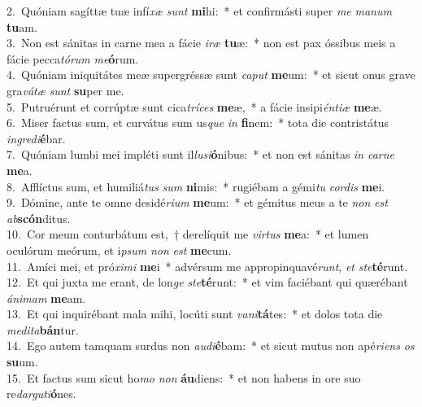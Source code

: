 {2.~}Quóniam sagíttæ tuæ infí\textit{xæ} \textit{sunt} \textbf{mi}hi:~* et confirmásti super \textit{me} \textit{ma}\textit{num} \textbf{tu}am.\\
{3.~}Non est sánitas in carne mea a fácie \textit{i}\textit{ræ} \textbf{tu}æ:~* non est pax óssibus meis a fácie pecca\textit{tó}\textit{rum} \textit{me}\textbf{ó}rum.\\
{4.~}Quóniam iniquitátes meæ supergréssæ sunt \textit{ca}\textit{put} \textbf{me}um:~* et sicut onus grave gra\textit{vá}\textit{tæ} \textit{sunt} \textbf{su}per me.\\
{5.~}Putruérunt et corrúptæ sunt cica\textit{trí}\textit{ces} \textbf{me}æ,~* a fácie insipi\textit{én}\textit{ti}\textit{æ} \textbf{me}æ.\\
{6.~}Miser factus sum, et curvátus sum us\textit{que} \textit{in} \textbf{fi}nem:~* tota die contristátus \textit{in}\textit{gre}\textit{di}\textbf{é}bar.\\
{7.~}Quóniam lumbi mei impléti sunt il\textit{lu}\textit{si}\textbf{ó}nibus:~* et non est sánitas \textit{in} \textit{car}\textit{ne} \textbf{me}a.\\
{8.~}Afflíctus sum, et humiliá\textit{tus} \textit{sum} \textbf{ni}mis:~* rugiébam a gémi\textit{tu} \textit{cor}\textit{dis} \textbf{me}i.\\
{9.~}Dómine, ante te omne desidé\textit{ri}\textit{um} \textbf{me}um:~* et gémitus meus a te \textit{non} \textit{est} \textit{ab}\textbf{scón}ditus.\\
{10.~}Cor meum conturbátum est,~† derelíquit me \textit{vir}\textit{tus} \textbf{me}a:~* et lumen oculórum meórum, et i\textit{psum} \textit{non} \textit{est} \textbf{me}cum.\\
{11.~}Amíci mei, et pró\textit{xi}\textit{mi} \textbf{me}i~* advérsum me appropinquavé\textit{runt}, \textit{et} \textit{ste}\textbf{té}runt.\\
{12.~}Et qui juxta me erant, de lon\textit{ge} \textit{ste}\textbf{té}runt:~* et vim faciébant qui quærébant \textit{á}\textit{ni}\textit{mam} \textbf{me}am.\\
{13.~}Et qui inquirébant mala mihi, locúti sunt \textit{va}\textit{ni}\textbf{tá}tes:~* et dolos tota die \textit{me}\textit{di}\textit{ta}\textbf{bán}tur.\\
{14.~}Ego autem tamquam surdus non \textit{au}\textit{di}\textbf{é}bam:~* et sicut mutus non apé\textit{ri}\textit{ens} \textit{os} \textbf{su}um.\\
{15.~}Et factus sum sicut ho\textit{mo} \textit{non} \textbf{áu}diens:~* et non habens in ore suo re\textit{dar}\textit{gu}\textit{ti}\textbf{ó}nes.\\

